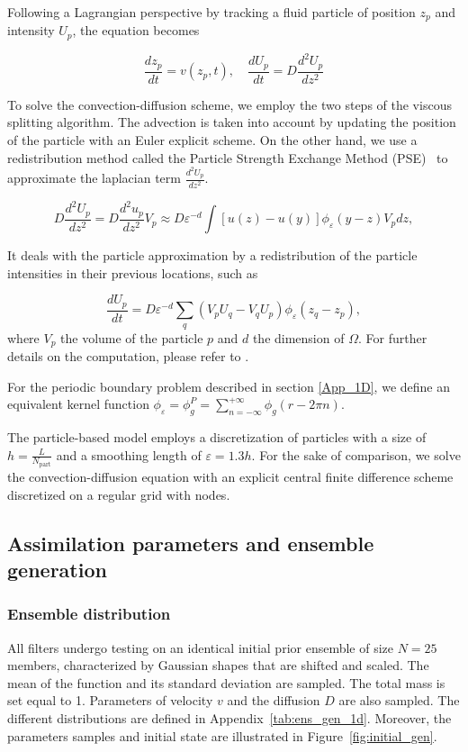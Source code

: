Following a Lagrangian perspective by tracking a fluid particle of position $z_p$ and intensity $U_p$, the equation becomes

\begin{equation*}
	\frac{dz_p}{dt} = v(z_p, t), \quad \frac{dU_p}{dt} = D \frac{d^2 U_p}{dz^2}
\end{equation*}

To solve the convection-diffusion scheme, we employ the two steps of the viscous splitting algorithm. The advection is taken into account by updating the position of the particle with an Euler explicit scheme.
On the other hand, we use a redistribution method called the Particle Strength Exchange Method (PSE)~\cite{degond_1989,cottet_1990} to approximate the laplacian term $\frac{d^2 U_p}{dz^2}$.


\begin{equation*}
	D \frac{d^2 U_p}{dz^2}  = D  \frac{d^2 u_p}{dz^2} V_p \approx D  \varepsilon^{-d} \int [u(z)  - u(y)] \phi_\varepsilon(y - z) V_p dz,
\end{equation*}

It deals with the particle approximation by a redistribution of the particle intensities in their previous locations, such as

\begin{equation*}
	\frac{dU_p}{dt} = D \varepsilon^{-d}  \sum_q (V_p U_q -V_q U_p) \phi_\varepsilon( z_q -  z_p),
\end{equation*}where $V_p$ the volume of the particle $p$ and $d$ the dimension of $\Omega$.
For further details on the computation, please refer to \cite{cottet_1990}.

For the periodic boundary problem described in section \ref{App_1D}, we define an equivalent kernel function $\phi_\varepsilon= \phi^P_g = \sum_{n=-\infty}^{+\infty} \phi_g(r - 2 \pi  n )$.

The particle-based model employs a discretization of \npart{} particles with a size of $h = \frac{L}{N_{\text{part}}}$ and a smoothing length of $\varepsilon = 1.3 h$.
For the sake of comparison, we solve the convection-diffusion equation with an explicit central finite difference scheme discretized on a regular grid with \ngrid{} nodes.

\subsection{Assimilation parameters and ensemble generation}

\subsubsection{Ensemble distribution}
All filters undergo testing on an identical initial prior ensemble of size $N = 25$ members, characterized by Gaussian shapes that are shifted and scaled. The mean of the function and its standard deviation are sampled. The total mass is set equal to 1. Parameters of velocity $v$ and the diffusion $D$ are also sampled. The different distributions are defined in Appendix~\ref{tab:ens_gen_1d}. Moreover, the parameters samples and initial state are illustrated in Figure~\ref{fig:initial_gen}.

